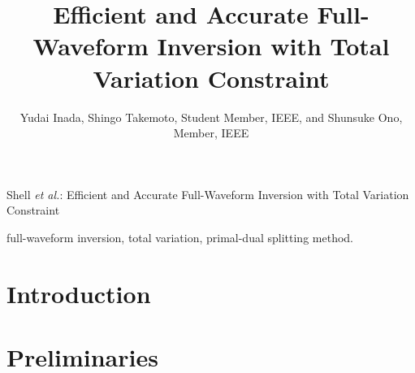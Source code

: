 \documentclass[journal]{IEEEtran}
\begin{document}
    

    \title{Efficient and Accurate Full-Waveform Inversion with Total Variation Constraint}

	\author{
        Yudai Inada, Shingo Takemoto, Student Member, IEEE, and Shunsuke Ono, Member, IEEE





		
	}

    {Shell \MakeLowercase{\textit{et al.}}: Efficient and Accurate Full-Waveform Inversion with Total Variation Constraint}

    \maketitle

    \begin{abstract}  \end{abstract}

    \begin{IEEEkeywords} full-waveform inversion, total variation, primal-dual splitting method. \end{IEEEkeywords}

    \IEEEpeerreviewmaketitle

    \section{Introduction}      \label{sec:Introduction}    

    \section{Preliminaries}     \label{sec:Preliminaries}   
\end{document}
